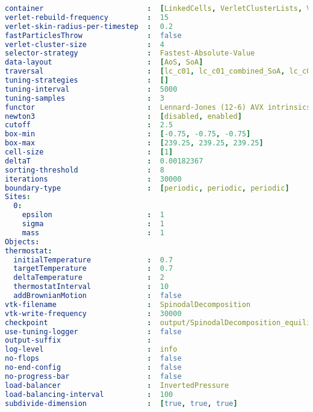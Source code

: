 \begin{lstlisting}[language=yaml,basicstyle=\tiny,breaklines=true,  caption={spinodalDecomposition.yaml}, label={lst:spinodalDecomposition}]
container                        :  [LinkedCells, VerletClusterLists, VerletLists, VerletListsCells, PairwiseVerletLists]
verlet-rebuild-frequency         :  15
verlet-skin-radius-per-timestep  :  0.2
fastParticlesThrow               :  false
verlet-cluster-size              :  4
selector-strategy                :  Fastest-Absolute-Value
data-layout                      :  [AoS, SoA]
traversal                        :  [lc_c01, lc_c01_combined_SoA, lc_c04, lc_c04_HCP, lc_c04_combined_SoA, lc_c08, lc_c18, lc_sliced, lc_sliced_balanced, lc_sliced_c02, ot_c01, ot_c18, vcl_c01_balanced, vcl_c06, vcl_sliced, vcl_sliced_balanced, vcl_sliced_c02, vl_list_iteration, vlc_c01, vlc_c18, vlc_sliced, vlc_sliced_balanced, vlc_sliced_c02, vlp_c01, vlp_c18, vlp_sliced, vlp_sliced_balanced, vlp_sliced_c02, vlp_c08, vvl_as_built]
tuning-strategies                :  []
tuning-interval                  :  5000
tuning-samples                   :  3
functor                          :  Lennard-Jones (12-6) AVX intrinsics
newton3                          :  [disabled, enabled]
cutoff                           :  2.5
box-min                          :  [-0.75, -0.75, -0.75]
box-max                          :  [239.25, 239.25, 239.25]
cell-size                        :  [1]
deltaT                           :  0.00182367
sorting-threshold                :  8
iterations                       :  30000
boundary-type                    :  [periodic, periodic, periodic]
Sites:                           
  0:
    epsilon                      :  1
    sigma                        :  1
    mass                         :  1
Objects:                         
thermostat:
  initialTemperature             :  0.7
  targetTemperature              :  0.7
  deltaTemperature               :  2
  thermostatInterval             :  10
  addBrownianMotion              :  false
vtk-filename                     :  SpinodalDecomposition
vtk-write-frequency              :  30000
checkpoint                       :  output/SpinodalDecomposition_equilibration/SpinodalDecomposition_equilibration_10000.pvtu
use-tuning-logger                :  false
output-suffix                    :  
log-level                        :  info
no-flops                         :  false
no-end-config                    :  false
no-progress-bar                  :  false
load-balancer                    :  InvertedPressure
load-balancing-interval          :  100
subdivide-dimension              :  [true, true, true]
\end{lstlisting}

